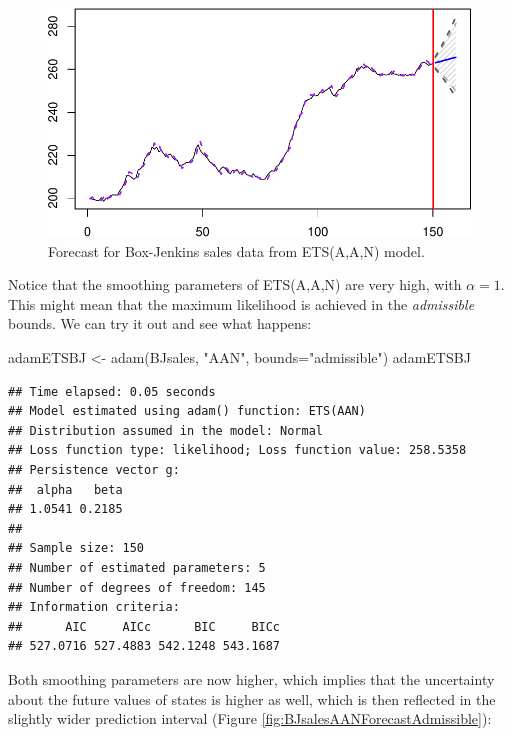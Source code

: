 \documentclass[
]{book}
\newenvironment{Shaded}{\begin{snugshade}}{\end{snugshade}}
\newcommand{\AttributeTok}[1]{\textcolor[rgb]{0.77,0.63,0.00}{#1}}
\newcommand{\FunctionTok}[1]{\textcolor[rgb]{0.00,0.00,0.00}{#1}}
\newcommand{\NormalTok}[1]{#1}
\newcommand{\OtherTok}[1]{\textcolor[rgb]{0.56,0.35,0.01}{#1}}
\newcommand{\StringTok}[1]{\textcolor[rgb]{0.31,0.60,0.02}{#1}}
\theoremstyle{definition}
\theoremstyle{definition}
\theoremstyle{definition}
\theoremstyle{definition}
\theoremstyle{remark}
\begin{document}
\begin{figure}
\centering
\includegraphics{Svetunkov--2022----ADAM_files/figure-latex/BJsalesAANForecast-1.pdf}
\caption{\label{fig:BJsalesAANForecast}Forecast for Box-Jenkins sales data from ETS(A,A,N) model.}
\end{figure}

Notice that the smoothing parameters of ETS(A,A,N) are very high, with \(\alpha=1\). This might mean that the maximum likelihood is achieved in the \emph{admissible} bounds. We can try it out and see what happens:

\begin{Shaded}
\begin{Highlighting}[]
\NormalTok{adamETSBJ }\OtherTok{\textless{}{-}} \FunctionTok{adam}\NormalTok{(BJsales, }\StringTok{"AAN"}\NormalTok{, }\AttributeTok{bounds=}\StringTok{"admissible"}\NormalTok{)}
\NormalTok{adamETSBJ}
\end{Highlighting}
\end{Shaded}

\begin{verbatim}
## Time elapsed: 0.05 seconds
## Model estimated using adam() function: ETS(AAN)
## Distribution assumed in the model: Normal
## Loss function type: likelihood; Loss function value: 258.5358
## Persistence vector g:
##  alpha   beta 
## 1.0541 0.2185 
## 
## Sample size: 150
## Number of estimated parameters: 5
## Number of degrees of freedom: 145
## Information criteria:
##      AIC     AICc      BIC     BICc 
## 527.0716 527.4883 542.1248 543.1687
\end{verbatim}

Both smoothing parameters are now higher, which implies that the uncertainty about the future values of states is higher as well, which is then reflected in the slightly wider prediction interval (Figure \ref{fig:BJsalesAANForecastAdmissible}):
\end{document}
